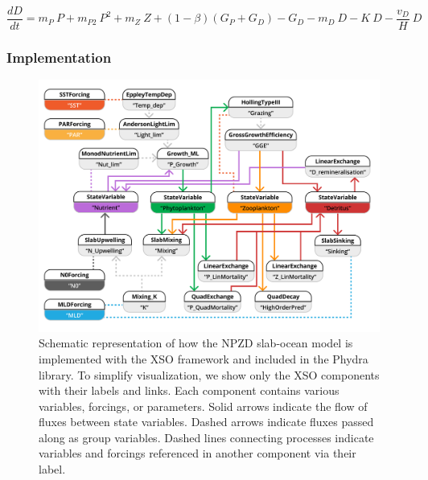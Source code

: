\documentclass[gmd, manuscript]{copernicus}
\begin{document}
\begin{equation}
    \label{Eq:EmpowerDet}
    \frac{d D}{d t} = 
    m_P \ P %
    + m_{P2} \ P^2 %
    + m_Z \ Z %
    + (1 - \beta)(G_P + G_D) %
    - G_D %
    - m_D \ D %
    - K \ D %
    - \frac{v_D}{H} \ D %
\end{equation}






\subsubsection{Implementation}
\label{Section:EMPOWERImplementation}



\begin{figure}[t]
\includegraphics[width=15cm]{Figures/firstdraft_schematics/code_schematics/EMPOWER.pdf}
\caption{Schematic representation of how the NPZD slab-ocean model is implemented with the XSO framework and included in the Phydra library. To simplify visualization, we show only the XSO components with their labels and links. Each component contains various variables, forcings, or parameters. Solid arrows indicate the flow of fluxes between state variables. Dashed arrows indicate fluxes passed along as group variables. Dashed lines connecting processes indicate variables and forcings referenced in another component via their label.}
\label{Figure:CodeSchematics_2}
\end{figure}
\end{document}
